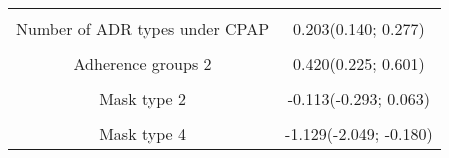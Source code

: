 \documentclass{article}
\begin{document}
\begin{longtable}[t]{cc}
\cellcolor{gray!6}{Duration since diagnosis (year)} & \cellcolor{gray!6}{-0.010(-0.057; 0.035)}\\
Number of ADR types under CPAP & 0.203(0.140; 0.277)\\
\cellcolor{gray!6}{Adherence groups 1} & \cellcolor{gray!6}{0.826(0.606; 1.031)}\\
Adherence groups 2 & 0.420(0.225; 0.601)\\
\cellcolor{gray!6}{Adherence groups 3} & \cellcolor{gray!6}{0.259(0.052; 0.468)}\\
Mask type 2 & -0.113(-0.293; 0.063)\\
\cellcolor{gray!6}{Mask type 3} & \cellcolor{gray!6}{-0.138(-0.371; 0.076)}\\
Mask type 4 & -1.129(-2.049; -0.180)\\*
\end{longtable}
\endgroup{}
\clearpage
\end{document}
